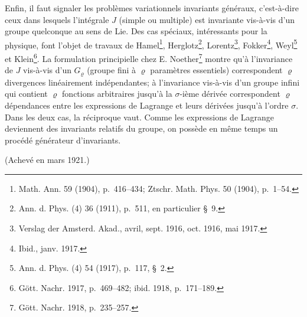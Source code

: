 \documentclass[11pt]{article}
\begin{document}
Enfin, il faut signaler les \og problèmes variationnels invariants \fg{} généraux, c'est-à-dire ceux dans lesquels l'intégrale $J$ (simple ou multiple) est invariante vis-à-vis d'un groupe quelconque au sens de Lie. Des cas spéciaux, intéressants pour la physique, font l'objet de travaux de Hamel\footnote{Math. Ann. 59 (1904), p.~416--434; Ztschr. Math. Phys. 50 (1904), p.~1--54.}, Herglotz\footnote{Ann. d. Phys. (4) 36 (1911), p.~511, en particulier \S~9.}, Lorentz\footnote{Verslag der Amsterd. Akad., avril, sept. 1916, oct. 1916, mai 1917.}, Fokker\footnote{Ibid., janv. 1917.}, Weyl\footnote{Ann. d. Phys. (4) 54 (1917), p.~117, \S~2.} et Klein\footnote{Gött. Nachr. 1917, p.~469--482; ibid. 1918, p.~171--189.}. La formulation principielle chez E. Noether\footnote{Gött. Nachr. 1918, p.~235--257.} montre qu'à l'invariance de $J$ vis-à-vis d'un $G_\varrho$ (groupe fini à $\varrho$ paramètres essentiels) correspondent $\varrho$ divergences linéairement indépendantes; à l'invariance vis-à-vis d'un groupe infini qui contient $\varrho$ fonctions arbitraires jusqu'à la $\sigma$-ième dérivée correspondent $\varrho$ dépendances entre les expressions de Lagrange et leurs dérivées jusqu'à l'ordre $\sigma$. Dans les deux cas, la réciproque vaut. Comme les expressions de Lagrange deviennent des invariants relatifs du groupe, on possède en même temps un procédé générateur d'invariants.

\begin{center}
(Achevé en mars 1921.)
\end{center}

\clearpage

\ifdefined\NoetherPaperTwentyOneBodyOnly
\else
\end{document}
